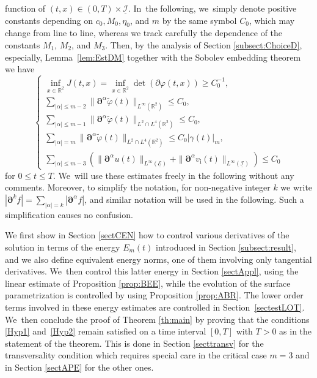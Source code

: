 \documentclass[10pt]{amsart}
\newcommand{\R}{{\mathbb R}}
\newcommand{\cI}{{\mathcal I}}
\newcommand{\cE}{{\mathcal E}}
\newcommand{\ul}[1]{\underline{#1}}
\theoremstyle{definition}
\begin{document}
function of $(t,x)\in(0,T)\times\ul{\cI}$. In~the following, we~simply denote positive constants depending on $c_0,M_0,\eta_0$, and $m$ by the same symbol $C_0$, which may change from line to line,
whereas we track carefully the dependence of the constants $M_1$, $M_2$, and $M_3$.
Then, by the analysis of Section \ref{subsect:ChoiceD}, especially, Lemma~\ref{lem:EstDM} together with the Sobolev embedding theorem we have
\[
\begin{cases}
\inf_{x\in\R^2}J(t,x) = \inf_{x\in\R^2}\det(\partial\varphi(t,x)) \geq C_0^{-1}, \\
\sum_{|\alpha| \leq m-2} \|\bm{\partial}^\alpha\widetilde{\varphi}(t)\|_{L^\infty(\R^2)} \leq C_0, \\
\sum_{|\alpha| \leq m-1} \|\bm{\partial}^\alpha\widetilde{\varphi}(t)\|_{L^2\cap L^4(\R^2)} \leq C_0, \\
\sum_{|\alpha| = m} \|\bm{\partial}^\alpha\widetilde{\varphi}(t)\|_{L^2\cap L^4(\R^2)} \leq C_0|\gamma(t)|_m, \\
\sum_{|\alpha| \leq m-3}(\|\bm{\partial}^\alpha u(t)\|_{L^\infty(\ul{\cE})} + \|\bm{\partial}^\alpha v_\mathrm{i}(t)\|_{L^\infty(\ul{\cI})}) \leq C_0
\end{cases}
\]
for $0\leq t\leq T$. We~will use these estimates freely in the following without any comments.
Moreover, to simplify the notation, for non-negative integer $k$ we write $|\bm{\partial}^k f|=\sum_{|\alpha|=k}|\bm{\partial}^\alpha f|$, and
similar notation will be used in the following.
Such a simplification causes no confusion.

We first show in Section \ref{sectCEN} how to control various derivatives of the solution in terms of the energy $E_m(t)$
introduced in Section \ref{subsect:result}, and we also define equivalent energy norms, one of them involving only tangential derivatives. We~then control this latter energy in Section \ref{sectAppl}, using the linear estimate of Proposition \ref{prop:BEE},
while the evolution of the surface parametrization is controlled by using Proposition \ref{prop:ABR}.
The lower order terms involved in these energy estimates are controlled in Section~\ref{sectestLOT}. We~then conclude the proof of Theorem \ref{th:main} by proving that the conditions \eqref{Hyp1} and~\eqref{Hyp2} remain satisfied
on a time interval $[0,T]$ with $T>0$ as in the statement of the theorem.
This is done in Section \ref{secttransv} for the transversality condition which requires special care in the critical case $m=3$
and in Section \ref{sectAPE} for the other ones.
\end{document}
